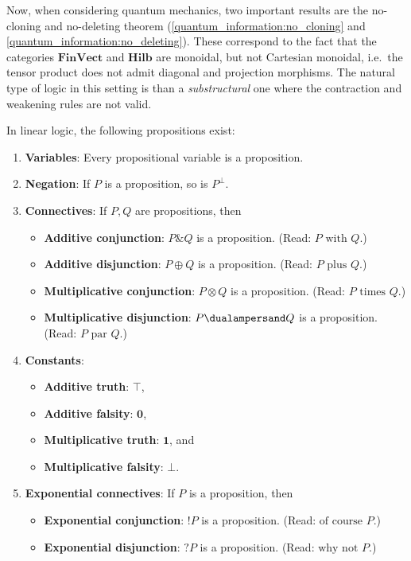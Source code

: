     Now, when considering quantum mechanics, two important results are the no-cloning and no-deleting theorem (\cref{quantum_information:no_cloning} and \cref{quantum_information:no_deleting}). These correspond to the fact that the categories $\mathbf{FinVect}$ and $\mathbf{Hilb}$ are monoidal, but not Cartesian monoidal, i.e.~the tensor product does not admit diagonal and projection morphisms. The natural type of logic in this setting is than a \textit{substructural} one where the contraction and weakening rules are not valid.

    In linear logic, the following propositions exist:
    \begin{enumerate}
        \item\textbf{Variables}: Every propositional variable is a proposition.
        \item\textbf{Negation}: If $P$ is a proposition, so is $P^\perp$.
        \item\textbf{Connectives}: If $P,Q$ are propositions, then
            \begin{itemize}
                \item\textbf{Additive conjunction}: $P\& Q$ is a proposition. (Read: $P\text{ with }Q$.)
                \item\textbf{Additive disjunction}: $P\oplus Q$ is a proposition. (Read: $P\text{ plus }Q$.)
                \item\textbf{Multiplicative conjunction}: $P\otimes Q$ is a proposition. (Read: $P\text{ times }Q$.)
                \item\textbf{Multiplicative disjunction}: $P\dualampersand Q$ is a proposition. (Read: $P\text{ par }Q$.)
            \end{itemize}
        \item\textbf{Constants}:
            \begin{itemize}
                \item\textbf{Additive truth}: $\top$,
                \item\textbf{Additive falsity}: $\mathbf{0}$,
                \item\textbf{Multiplicative truth}: $\mathbf{1}$, and
                \item\textbf{Multiplicative falsity}: $\bot$.
            \end{itemize}
        \item\textbf{Exponential connectives}: If $P$ is a proposition, then
            \begin{itemize}
                \item\textbf{Exponential conjunction}: $!P$ is a proposition. (Read: $\text{of course }P$.)
                \item\textbf{Exponential disjunction}: $?P$ is a proposition. (Read: $\text{why not }P$.)
            \end{itemize}
    \end{enumerate}
